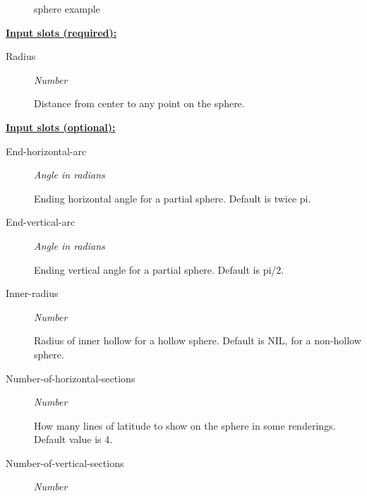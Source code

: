 \documentclass [11pt]{book}
\begin{document}
\begin{itemize}
\begin{figure}
\caption{sphere example}

\label{fig:sphere}

\end{figure}





\textbf{
\underline{Input slots (required):}}

\begin{description}

\item [Radius]
\emph{Number}

 Distance from center to any point on the sphere.




\end{description}






\textbf{
\underline{Input slots (optional):}}

\begin{description}

\item [End-horizontal-arc]
\emph{Angle in radians}

 Ending horizontal angle for a partial sphere. Default is twice pi.




\item [End-vertical-arc]
\emph{Angle in radians}

 Ending vertical angle for a partial sphere. Default is pi/2.




\item [Inner-radius]
\emph{Number}

 Radius of inner hollow for a hollow sphere. Default is NIL, for a non-hollow sphere.




\item [Number-of-horizontal-sections]
\emph{Number}

 How many lines of latitude to show on the sphere in some renderings. Default value is 4.




\item [Number-of-vertical-sections]
\emph{Number}


\end{description}
\end{itemize}
\end{document}
